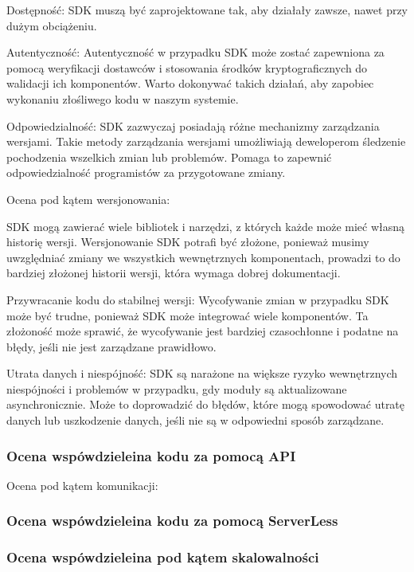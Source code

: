 \documentclass[runningheads,12pt]{llncs}
\begin{document}
Dostępność: SDK muszą być zaprojektowane tak, aby działały zawsze, nawet przy dużym obciążeniu. ~\cite[para 6]{azure2020}

Autentyczność: Autentyczność w przypadku SDK może zostać zapewniona za pomocą weryfikacji dostawców i stosowania środków kryptograficznych do walidacji ich komponentów. Warto dokonywać takich działań, aby zapobiec wykonaniu złośliwego kodu w naszym systemie. ~\cite[para 7]{azure2020}

Odpowiedzialność: SDK zazwyczaj posiadają różne mechanizmy zarządzania wersjami. Takie metody zarządzania wersjami umożliwiają deweloperom śledzenie pochodzenia wszelkich zmian lub problemów. Pomaga to zapewnić odpowiedzialność programistów za przygotowane zmiany. ~\cite[para 7]{azure2020}

Ocena pod kątem wersjonowania:

SDK mogą zawierać wiele bibliotek i narzędzi, z których każde może mieć własną historię wersji. Wersjonowanie SDK potrafi być złożone, ponieważ musimy uwzględniać zmiany we wszystkich wewnętrznych komponentach, prowadzi to do bardziej złożonej historii wersji, która wymaga dobrej dokumentacji. ~\cite[para. 3]{azure2020}

Przywracanie kodu do stabilnej wersji: Wycofywanie zmian w przypadku SDK może być trudne, ponieważ SDK może integrować wiele komponentów. Ta złożoność może sprawić, że wycofywanie jest bardziej czasochłonne i podatne na błędy, jeśli nie jest zarządzane prawidłowo. ~\cite[para. 3]{azure2020}

Utrata danych i niespójność: SDK są narażone na większe ryzyko wewnętrznych niespójności i problemów w przypadku, gdy moduły są aktualizowane asynchronicznie. Może to doprowadzić do błędów, które mogą spowodować utratę danych lub uszkodzenie danych, jeśli nie są w odpowiedni sposób zarządzane. ~\cite[para. 3]{azure2020}

\subsubsection{Ocena wspówdzieleina kodu za pomocą API}

Ocena pod kątem komunikacji: 

\subsubsection{Ocena wspówdzieleina kodu za pomocą ServerLess}

\subsubsection{Ocena wspówdzieleina pod kątem skalowalności}
\end{document}
